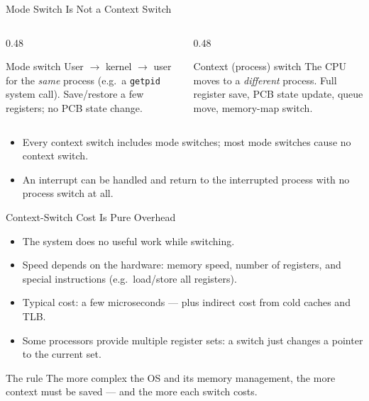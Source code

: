 \documentclass[aspectratio=169]{beamer}
\begin{document}
\begin{frame}{Mode Switch Is Not a Context Switch}
  \begin{columns}[T]
    \begin{column}{0.48\textwidth}
      \begin{block}{Mode switch}
        User $\to$ kernel $\to$ user for the \emph{same} process (e.g.\ a
        \texttt{getpid} system call). Save/restore a few registers; no PCB
        state change.
      \end{block}
    \end{column}
    \begin{column}{0.48\textwidth}
      \begin{block}{Context (process) switch}
        The CPU moves to a \emph{different} process. Full register save,
        PCB state update, queue move, memory-map switch.
      \end{block}
    \end{column}
  \end{columns}
  \vspace{0.3cm}
  \begin{itemize}
    \item Every context switch includes mode switches; most mode switches
      cause no context switch.
    \item An interrupt can be handled and return to the interrupted process
      with no process switch at all.
  \end{itemize}
\end{frame}

\begin{frame}{Context-Switch Cost Is Pure Overhead}
  \begin{itemize}
    \item The system does no useful work while switching.
    \item Speed depends on the hardware: memory speed, number of registers,
      and special instructions (e.g.\ load/store all registers).
    \item Typical cost: a few microseconds --- plus indirect cost from cold
      caches and TLB.
    \item Some processors provide multiple register sets: a switch just
      changes a pointer to the current set.
  \end{itemize}
  \vspace{0.2cm}
  \begin{alertblock}{The rule}
    The more complex the OS and its memory management, the more context must
    be saved --- and the more each switch costs.
  \end{alertblock}
\end{frame}
\end{document}
